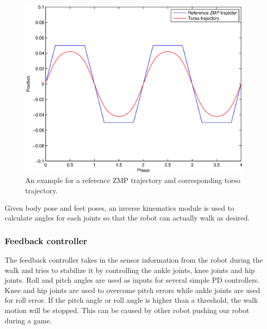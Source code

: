 \documentclass{article}
\begin{document}
\begin{figure}[H]
		\centering
		\includegraphics[width=1\textwidth]{figures/ZMP.eps}
		\caption{An example for a reference ZMP trajectory and corresponding torso trajectory.}
	\end{figure}
Given body pose and feet poses, an inverse kinematics module is used to calculate angles for each joints so that the robot can actually walk as desired.

\subsubsection{Feedback controller}
	The feedback controller takes in the sensor information from the robot during the walk and tries to stabilize it by controlling the ankle joints, knee joints and hip joints. Roll and pitch angles are used as inputs for several simple PD controllers. Knee and hip joints are used to overcome pitch errors while ankle joints are used for roll error. If the pitch angle or roll angle is higher than a threshold, the walk motion will be stopped. This can be caused by other robot pushing our robot during a game.   
  
\end{document}
